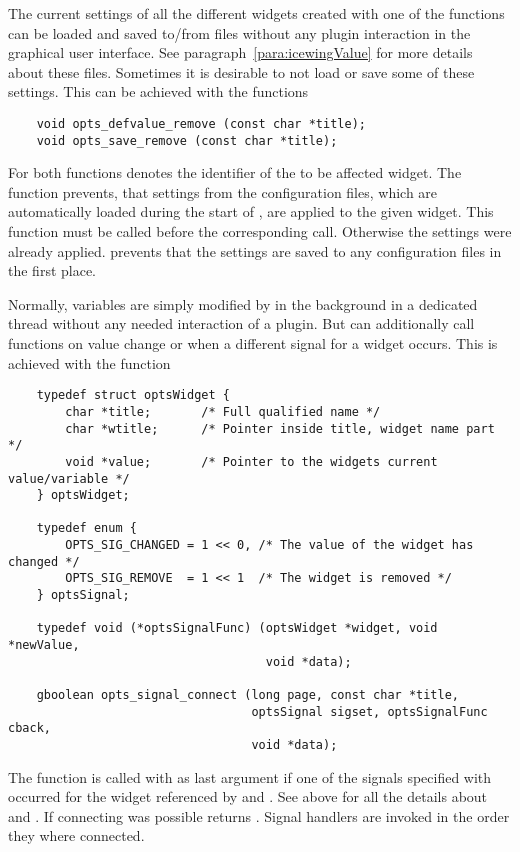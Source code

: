 The current settings of all the different widgets created with one
of the  functions can be loaded
and saved to/from files without any plugin interaction in the
graphical user interface. See paragraph~\ref{para:icewingValue} for
more details about these files. Sometimes it is desirable to not
load or save some of these settings. This can be achieved with the
functions
\label{page:p_defvalue_remove}
\begin{small}
\linespread{0.9}
\begin{verbatim}
    void opts_defvalue_remove (const char *title);
    void opts_save_remove (const char *title);
\end{verbatim}
\end{small}
For both functions  denotes the identifier of the to be
affected widget. The function 
prevents, that settings from the configuration files, which are
automatically loaded during the start of \icewing{}, are applied to
the given widget. This function must be called before the
corresponding  call. Otherwise the
settings were already applied.  prevents
that the settings are saved to any configuration files in the first
place.

Normally, variables are simply modified by \icewing{} in the
background in a dedicated thread without any needed interaction of a
plugin. But \icewing{} can additionally call functions on value
change or when a different signal for a widget occurs. This is
achieved with the function
\begin{small}
\linespread{0.9}
\begin{verbatim}
    typedef struct optsWidget {
        char *title;       /* Full qualified name */
        char *wtitle;      /* Pointer inside title, widget name part */
        void *value;       /* Pointer to the widgets current value/variable */
    } optsWidget;

    typedef enum {
        OPTS_SIG_CHANGED = 1 << 0, /* The value of the widget has changed */
        OPTS_SIG_REMOVE  = 1 << 1  /* The widget is removed */
    } optsSignal;

    typedef void (*optsSignalFunc) (optsWidget *widget, void *newValue,
                                    void *data);

    gboolean opts_signal_connect (long page, const char *title,
                                  optsSignal sigset, optsSignalFunc cback,
                                  void *data);
\end{verbatim}
\end{small}
The function  is called with  as last argument
if one of the signals specified with  occurred for the
widget referenced by  and . See
 above for all the details about
 and . If connecting  was possible
 returns . Signal handlers
are invoked in the order they where connected.

